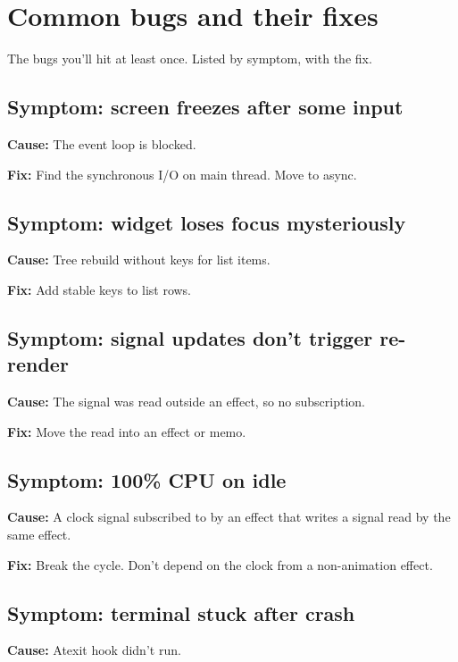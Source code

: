 \chapter{Common bugs and their fixes}
\label{ch:commonbugs}

\begin{aside}
The bugs you'll hit at least once. Listed by symptom, with
the fix.
\end{aside}

\section{Symptom: screen freezes after some input}

\textbf{Cause:} The event loop is blocked.

\textbf{Fix:} Find the synchronous I/O on main thread.
Move to async.

\section{Symptom: widget loses focus mysteriously}

\textbf{Cause:} Tree rebuild without keys for list items.

\textbf{Fix:} Add stable keys to list rows.

\section{Symptom: signal updates don't trigger re-render}

\textbf{Cause:} The signal was read outside an effect, so
no subscription.

\textbf{Fix:} Move the read into an effect or memo.

\section{Symptom: 100\% CPU on idle}

\textbf{Cause:} A clock signal subscribed to by an effect
that writes a signal read by the same effect.

\textbf{Fix:} Break the cycle. Don't depend on the clock
from a non-animation effect.

\section{Symptom: terminal stuck after crash}

\textbf{Cause:} Atexit hook didn't run.

